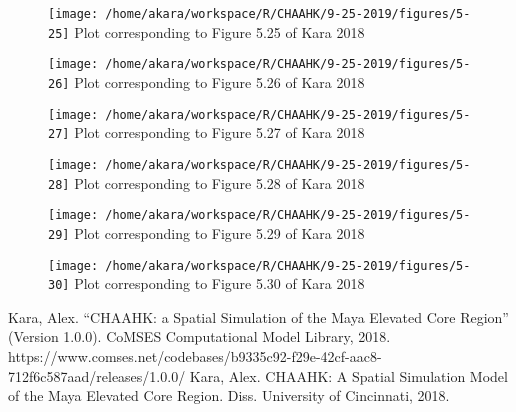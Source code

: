 \documentclass{article}
\begin{document}
\begin{figure}[H]
	\texttt{[image: /home/akara/workspace/R/CHAAHK/9-25-2019/figures/5-25]}
	Plot corresponding to Figure 5.25 of Kara 2018
	\label{fig:5-25}
\end{figure}
\begin{figure}[H]
	\texttt{[image: /home/akara/workspace/R/CHAAHK/9-25-2019/figures/5-26]}
	Plot corresponding to Figure 5.26 of Kara 2018
	\label{fig:5-26}
\end{figure}
\begin{figure}[H]
	\texttt{[image: /home/akara/workspace/R/CHAAHK/9-25-2019/figures/5-27]}
	Plot corresponding to Figure 5.27 of Kara 2018
	\label{fig:5-27}
\end{figure}
\begin{figure}[H]
	\texttt{[image: /home/akara/workspace/R/CHAAHK/9-25-2019/figures/5-28]}
	Plot corresponding to Figure 5.28 of Kara 2018
	\label{fig:5-28}
\end{figure}
\begin{figure}[H]
	\texttt{[image: /home/akara/workspace/R/CHAAHK/9-25-2019/figures/5-29]}
	Plot corresponding to Figure 5.29 of Kara 2018
	\label{fig:5-29}
\end{figure}
\begin{figure}[H]
	\texttt{[image: /home/akara/workspace/R/CHAAHK/9-25-2019/figures/5-30]}
	Plot corresponding to Figure 5.30 of Kara 2018
	\label{fig:5-30}
\end{figure}
\begin{thebibliography}{9}
	Kara, Alex. ``CHAAHK: a Spatial Simulation of the Maya Elevated Core Region'' (Version 1.0.0). CoMSES Computational Model Library, 2018. https://www.comses.net/codebases/b9335c92-f29e-42cf-aac8-712f6c587aad/releases/1.0.0/
	Kara, Alex. CHAAHK: A Spatial Simulation Model of the Maya Elevated Core Region. Diss. University of Cincinnati, 2018.
\end{thebibliography}
\end{document}
